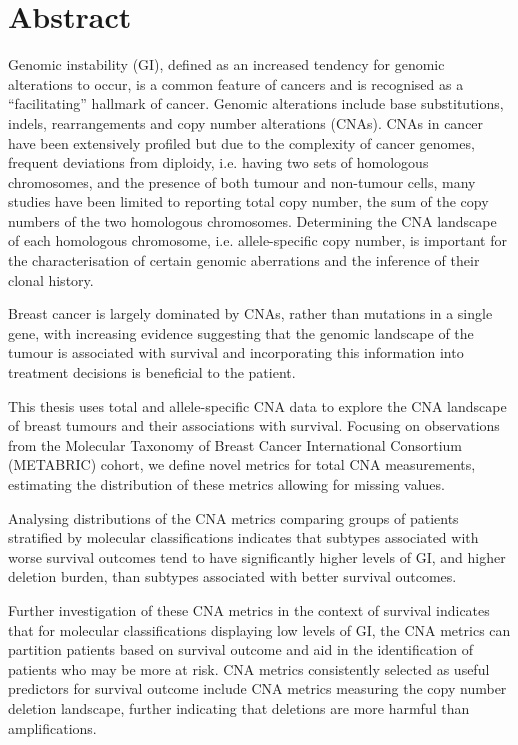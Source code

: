 \section*{\Large{Abstract}}
    \vspace{0.5cm}
    
Genomic instability (GI), defined as an increased tendency for genomic alterations to occur, is a common feature of cancers and is recognised as a “facilitating” hallmark of cancer. Genomic alterations include base substitutions, indels, rearrangements and copy number alterations (CNAs). CNAs in cancer have been extensively profiled but due to the complexity of cancer genomes, frequent deviations from diploidy, i.e. having two sets of homologous chromosomes, and the presence of both tumour and non-tumour cells, many studies have been limited to reporting total copy number, the sum of the copy numbers of the two homologous chromosomes. Determining the CNA landscape of each homologous chromosome, i.e. allele-specific copy number, is important for the characterisation of certain genomic aberrations and the inference of their clonal history.   

Breast cancer is largely dominated by CNAs, rather than mutations in a single gene, with increasing evidence suggesting that the genomic landscape of the tumour is associated with survival and incorporating this information into treatment decisions is beneficial to the patient. 

This thesis uses total and allele-specific CNA data to explore the CNA landscape of breast tumours and their associations with survival. Focusing on observations from the Molecular Taxonomy of Breast Cancer International Consortium (METABRIC) cohort, we define novel metrics for total CNA measurements, estimating the distribution of these metrics allowing for missing values. 

Analysing distributions of the CNA metrics comparing groups of patients stratified by molecular classifications indicates that subtypes associated with worse survival outcomes tend to have significantly higher levels of GI, and higher deletion burden, than subtypes associated with better survival outcomes.   

Further investigation of these CNA metrics in the context of survival indicates that for molecular classifications displaying low levels of GI, the CNA metrics can partition patients based on survival outcome and aid in the identification of patients who may be more at risk. CNA metrics consistently selected as useful predictors for survival outcome include CNA metrics measuring the copy number deletion landscape, further indicating that deletions are more harmful than amplifications. 

